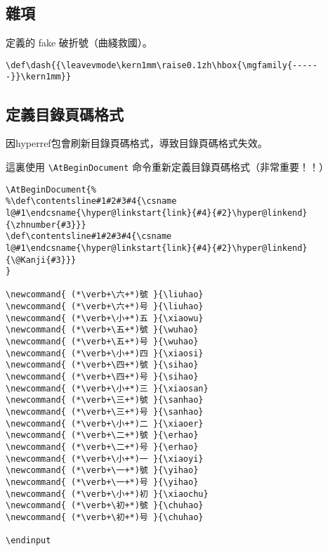 \subsection{雜項}

\par 定義的 fake 破折號（曲綫救國）。
\begin{lstlisting}[firstnumber=1538]
\def\dash{{\leavevmode\kern1mm\raise0.1zh\hbox{\mgfamily{------}}\kern1mm}}
\end{lstlisting}



\subsection{定義目錄頁碼格式}
\par 因hyperref包會刷新目錄頁碼格式，導致目錄頁碼格式失效。
\par 這裏使用 \verb+\AtBeginDocument+ 命令重新定義目錄頁碼格式（非常重要！！）
\begin{lstlisting}[firstnumber=1541]
\AtBeginDocument{%
%\def\contentsline#1#2#3#4{\csname l@#1\endcsname{\hyper@linkstart{link}{#4}{#2}\hyper@linkend}{\zhnumber{#3}}}
\def\contentsline#1#2#3#4{\csname l@#1\endcsname{\hyper@linkstart{link}{#4}{#2}\hyper@linkend}{\@Kanji{#3}}}
}

\newcommand{ (*\verb+\六+*)號 }{\liuhao}
\newcommand{ (*\verb+\六+*)号 }{\liuhao}
\newcommand{ (*\verb+\小+*)五 }{\xiaowu}
\newcommand{ (*\verb+\五+*)號 }{\wuhao}
\newcommand{ (*\verb+\五+*)号 }{\wuhao}
\newcommand{ (*\verb+\小+*)四 }{\xiaosi}
\newcommand{ (*\verb+\四+*)號 }{\sihao}
\newcommand{ (*\verb+\四+*)号 }{\sihao}
\newcommand{ (*\verb+\小+*)三 }{\xiaosan}
\newcommand{ (*\verb+\三+*)號 }{\sanhao}
\newcommand{ (*\verb+\三+*)号 }{\sanhao}
\newcommand{ (*\verb+\小+*)二 }{\xiaoer}
\newcommand{ (*\verb+\二+*)號 }{\erhao}
\newcommand{ (*\verb+\二+*)号 }{\erhao}
\newcommand{ (*\verb+\小+*)一 }{\xiaoyi}
\newcommand{ (*\verb+\一+*)號 }{\yihao}
\newcommand{ (*\verb+\一+*)号 }{\yihao}
\newcommand{ (*\verb+\小+*)初 }{\xiaochu}
\newcommand{ (*\verb+\初+*)號 }{\chuhao}
\newcommand{ (*\verb+\初+*)号 }{\chuhao}

\endinput
\end{lstlisting}


\endinput